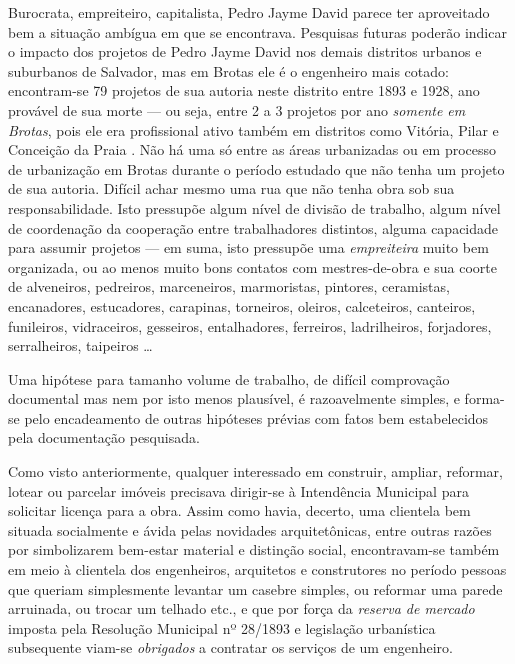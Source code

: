 Burocrata, empreiteiro, capitalista, Pedro Jayme David parece ter aproveitado bem a situação ambígua em que se encontrava. Pesquisas futuras poderão indicar o impacto dos projetos de Pedro Jayme David nos demais distritos urbanos e suburbanos de Salvador, mas em Brotas ele é o engenheiro mais cotado: encontram-se 79 projetos de sua autoria neste distrito entre 1893 e 1928, ano provável de sua morte --- ou seja, entre 2 a 3 projetos por ano \textit{somente em Brotas}, pois ele era profissional ativo também em distritos como Vitória, Pilar e Conceição da Praia \cite{almeida_victoria_1997, almeida_vitrinescomercio_2014}. Não há uma só entre as áreas urbanizadas ou em processo de urbanização em Brotas durante o período estudado que não tenha um projeto de sua autoria. Difícil achar mesmo uma rua que não tenha obra sob sua responsabilidade. Isto pressupõe algum nível de divisão de trabalho, algum nível de coordenação da cooperação entre trabalhadores distintos, alguma capacidade para assumir projetos --- em suma, isto pressupõe uma \textit{empreiteira} muito bem organizada, ou ao menos muito bons contatos com mestres-de-obra e sua coorte de alveneiros, pedreiros, marceneiros, marmoristas, pintores, ceramistas, encanadores, estucadores, carapinas, torneiros, oleiros, calceteiros, canteiros, funileiros, vidraceiros, gesseiros, entalhadores, ferreiros, ladrilheiros,  forjadores, serralheiros, taipeiros \dots

Uma hipótese para tamanho volume de trabalho, de difícil comprovação documental mas nem por isto menos plausível, é razoavelmente simples, e forma-se pelo encadeamento de outras hipóteses prévias com fatos bem estabelecidos pela documentação pesquisada. 

Como visto anteriormente, qualquer interessado em construir, ampliar, reformar, lotear ou parcelar imóveis precisava dirigir-se à Intendência Municipal para solicitar licença para a obra. Assim como havia, decerto, uma clientela bem situada socialmente e ávida pelas novidades arquitetônicas, entre outras razões por simbolizarem bem-estar material e distinção social, encontravam-se também em meio à clientela dos engenheiros, arquitetos e construtores no período pessoas que queriam simplesmente levantar um casebre simples, ou reformar uma parede arruinada, ou trocar um telhado etc., e que por força da \textit{reserva de mercado} imposta pela Resolução Municipal nº 28/1893 e legislação urbanística subsequente viam-se \textit{obrigados} a contratar os serviços de um engenheiro.

